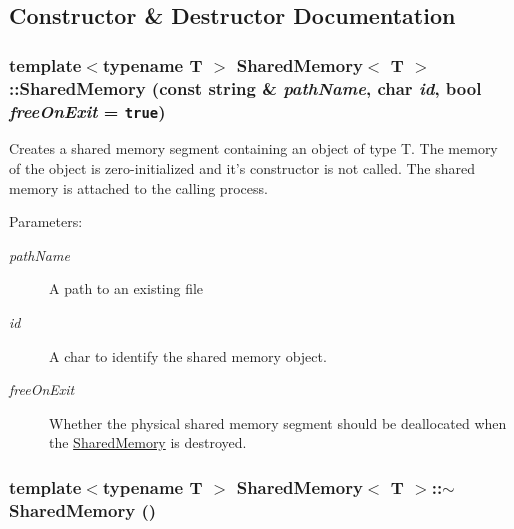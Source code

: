 \subsection{Constructor \& Destructor Documentation}
\hypertarget{classSharedMemory_aaafab5859496d60eb465bea20274755}{
\subsubsection[{SharedMemory}]{\setlength{\rightskip}{0pt plus 5cm}template$<$typename T $>$ {\bf SharedMemory}$<$ T $>$::{\bf SharedMemory} (const string \& {\em pathName}, \/  char {\em id}, \/  bool {\em freeOnExit} = {\tt true})}}
\label{classSharedMemory_aaafab5859496d60eb465bea20274755}


Creates a shared memory segment containing an object of type T. The memory of the object is zero-initialized and it's constructor is not called. The shared memory is attached to the calling process.

\begin{Desc}
\item[Parameters:]
\begin{description}
\item[{\em pathName}]A path to an existing file \item[{\em id}]A char to identify the shared memory object. \item[{\em freeOnExit}]Whether the physical shared memory segment should be deallocated when the \hyperlink{classSharedMemory}{SharedMemory} is destroyed. \end{description}
\end{Desc}
\hypertarget{classSharedMemory_aec1d3ed5785f82542a660556579cc32}{
\subsubsection[{$\sim$SharedMemory}]{\setlength{\rightskip}{0pt plus 5cm}template$<$typename T $>$ {\bf SharedMemory}$<$ T $>$::$\sim${\bf SharedMemory} ()}}
\label{classSharedMemory_aec1d3ed5785f82542a660556579cc32}


